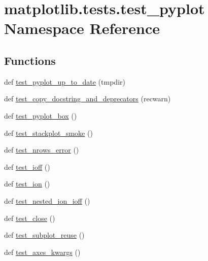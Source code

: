 \hypertarget{namespacematplotlib_1_1tests_1_1test__pyplot}{}\section{matplotlib.\+tests.\+test\+\_\+pyplot Namespace Reference}
\label{namespacematplotlib_1_1tests_1_1test__pyplot}
\subsection*{Functions}
\begin{DoxyCompactItemize}
\item 
def \hyperlink{namespacematplotlib_1_1tests_1_1test__pyplot_abeb11088eb48fa9ef633435f7cfc49b7}{test\+\_\+pyplot\+\_\+up\+\_\+to\+\_\+date} (tmpdir)
\item 
def \hyperlink{namespacematplotlib_1_1tests_1_1test__pyplot_ad2bc74d50fb2accafb3096d1be86d9e1}{test\+\_\+copy\+\_\+docstring\+\_\+and\+\_\+deprecators} (recwarn)
\item 
def \hyperlink{namespacematplotlib_1_1tests_1_1test__pyplot_a94e2ebc0b84aa86885ffbc23207b8c51}{test\+\_\+pyplot\+\_\+box} ()
\item 
def \hyperlink{namespacematplotlib_1_1tests_1_1test__pyplot_a2dc874f4e5f02522e9ba3e41489466aa}{test\+\_\+stackplot\+\_\+smoke} ()
\item 
def \hyperlink{namespacematplotlib_1_1tests_1_1test__pyplot_ad6b44a3d8c942c41af3449a8e9bcd245}{test\+\_\+nrows\+\_\+error} ()
\item 
def \hyperlink{namespacematplotlib_1_1tests_1_1test__pyplot_ac52018fbc896dab23ab8a434cf3a418e}{test\+\_\+ioff} ()
\item 
def \hyperlink{namespacematplotlib_1_1tests_1_1test__pyplot_a8ef4b0211bbd5f7b3c918a95b71ed0f5}{test\+\_\+ion} ()
\item 
def \hyperlink{namespacematplotlib_1_1tests_1_1test__pyplot_a1ab4b7f15b2f946d539c1d073c6035cb}{test\+\_\+nested\+\_\+ion\+\_\+ioff} ()
\item 
def \hyperlink{namespacematplotlib_1_1tests_1_1test__pyplot_aa48129bc371f744417e8ed12c35dee84}{test\+\_\+close} ()
\item 
def \hyperlink{namespacematplotlib_1_1tests_1_1test__pyplot_ab7fd325226a7e465698ffac7608262b4}{test\+\_\+subplot\+\_\+reuse} ()
\item 
def \hyperlink{namespacematplotlib_1_1tests_1_1test__pyplot_ab0f8d217aaebdc06916793420f174c7e}{test\+\_\+axes\+\_\+kwargs} ()

\end{DoxyCompactItemize}
